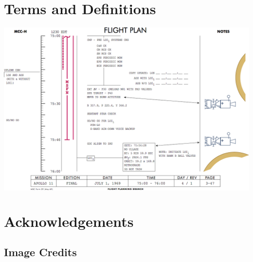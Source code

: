 \appendix
\addappheadtotoc
\chapter{Terms and Definitions}

\glsaddall

\begin{multicols}{2}
\printglossaries
\end{multicols}

\vspace*{\fill}
\begin{center}
	\includegraphics[width=.9\textwidth]{images/flightplan3}
\end{center}
\vspace*{\fill}

\clearpage

\chapter{Acknowledgements}
\section*{Image Credits}

